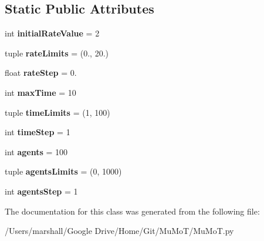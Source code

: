 \subsection*{Static Public Attributes}
\begin{DoxyCompactItemize}
\item 
\mbox{\label{class_mu_mo_t_1_1_mu_mo_tdefault_adde745c01a8123d91803db44be715c11}} 
int {\bfseries initial\+Rate\+Value} = 2
\item 
\mbox{\label{class_mu_mo_t_1_1_mu_mo_tdefault_a83ca64eab9c90fa62fa4a0e372f02067}} 
tuple {\bfseries rate\+Limits} = (0., 20.)
\item 
\mbox{\label{class_mu_mo_t_1_1_mu_mo_tdefault_ac9e204f6ebb51fdde6757e05a98631ec}} 
float {\bfseries rate\+Step} = 0.
\item 
\mbox{\label{class_mu_mo_t_1_1_mu_mo_tdefault_af21a89a812c2d76e78c617b62d86e0f1}} 
int {\bfseries max\+Time} = 10
\item 
\mbox{\label{class_mu_mo_t_1_1_mu_mo_tdefault_a54d76b53c7a1285ef74cce945c63a6f2}} 
tuple {\bfseries time\+Limits} = (1, 100)
\item 
\mbox{\label{class_mu_mo_t_1_1_mu_mo_tdefault_a99761e20122fadd1e9effeedfb6aeaab}} 
int {\bfseries time\+Step} = 1
\item 
\mbox{\label{class_mu_mo_t_1_1_mu_mo_tdefault_a0b8d95250c3211adb5d1574728478ccc}} 
int {\bfseries agents} = 100
\item 
\mbox{\label{class_mu_mo_t_1_1_mu_mo_tdefault_a016a4e80495ed5efea5d12d788dc30f9}} 
tuple {\bfseries agents\+Limits} = (0, 1000)
\item 
\mbox{\label{class_mu_mo_t_1_1_mu_mo_tdefault_ab16f490800ce396907c5d25db5df0eea}} 
int {\bfseries agents\+Step} = 1
\end{DoxyCompactItemize}


The documentation for this class was generated from the following file\+:\begin{DoxyCompactItemize}
\item 
/\+Users/marshall/\+Google Drive/\+Home/\+Git/\+Mu\+Mo\+T/Mu\+Mo\+T.\+py\end{DoxyCompactItemize}
